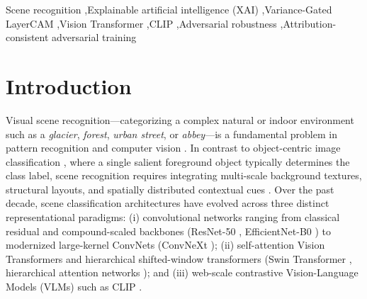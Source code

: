 \documentclass[final,5p,times,twocolumn]{elsarticle}
\begin{document}
\begin{frontmatter}
\begin{keyword}
Scene recognition \sep Explainable artificial intelligence (XAI) \sep Variance-Gated LayerCAM \sep Vision Transformer \sep CLIP \sep Adversarial robustness \sep Attribution-consistent adversarial training
\end{keyword}

\end{frontmatter}

\section{Introduction}
\label{sec:intro}
Visual scene recognition---categorizing a complex natural or indoor environment such as a \emph{glacier}, \emph{forest}, \emph{urban street}, or \emph{abbey}---is a fundamental problem in pattern recognition and computer vision \cite{oliva2001modeling,lazebnik2006beyond,xiao2010sun,zhou2017places}. In contrast to object-centric image classification \cite{deng2009imagenet}, where a single salient foreground object typically determines the class label, scene recognition requires integrating multi-scale background textures, structural layouts, and spatially distributed contextual cues \cite{quattoni2009recognizing,xiao2016sun,tao2023smoke}. Over the past decade, scene classification architectures have evolved across three distinct representational paradigms: (i) convolutional networks ranging from classical residual and compound-scaled backbones (ResNet-50 \cite{he2016deep}, EfficientNet-B0 \cite{tan2019efficientnet}) to modernized large-kernel ConvNets (ConvNeXt \cite{liu2022convnet}); (ii) self-attention Vision Transformers \cite{dosovitskiy2021an,touvron2021training} and hierarchical shifted-window transformers (Swin Transformer \cite{liu2021swin}, hierarchical attention networks \cite{tao2024hierarchical}); and (iii) web-scale contrastive Vision-Language Models (VLMs) such as CLIP \cite{radford2021learning,jia2021scaling,cherti2023reproducible}.
\end{document}
